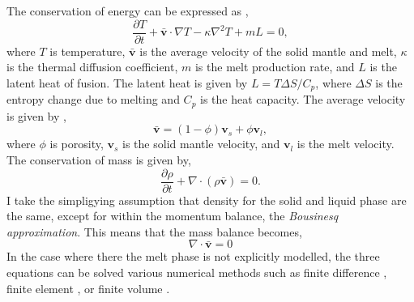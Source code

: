 \begin{subappendices}
The conservation of energy can be expressed as \citep[e.g.][]{ribe-1985},
\begin{equation}
\frac{\partial T}{\partial t} + \bar{\mathbf{v}} \cdot \nabla T - \kappa\nabla^{2} T + mL = 0,
\label{eq:energy}
\end{equation}
where $T$ is temperature, $\bar{\mathbf{v}}$ is the average velocity of the solid mantle and melt, $\kappa$ is the thermal diffusion coefficient, $m$ is the melt production rate, and $L$ is the latent heat of fusion. The latent heat is given by $L = T\Delta S/C_{p}$, where $\Delta S$ is the entropy change due to melting and $C_{p}$ is the heat capacity. The average velocity is given by \citep{scott-1992},
\begin{equation}
\bar{\mathbf{v}} = \left(1-\phi\right)\mathbf{v}_{s} + \phi \mathbf{v}_{l},
\label{eq:average-velocity}
\end{equation}
where $\phi$ is porosity, $\mathbf{v}_{s}$ is the solid mantle velocity, and $\mathbf{v}_{l}$ is the melt velocity. The conservation of mass is given by,
\begin{equation}
\frac{\partial \rho}{\partial t} + \nabla \cdot \left(\rho \bar{\mathbf{v}} \right) = 0.
\end{equation}
I take the simpligying assumption that density for the solid and liquid phase are the same, except for within the momentum balance, the \emph{Bousinesq approximation}. This means that the mass balance becomes,
\begin{equation}
\nabla \cdot \bar{\mathbf{v}} = 0
\label{eq:mass}
\end{equation}
In the case where there the melt phase is not explicitly modelled, the three equations can be solved various numerical methods such as finite difference \citep[e.g.][]{armitage-etal-g3-2018}, finite element \citep[e.g.][]{armitage-etal-2008}, or finite volume \citep[e.g.][]{civiero-etal-2019}.


\end{subappendices}
